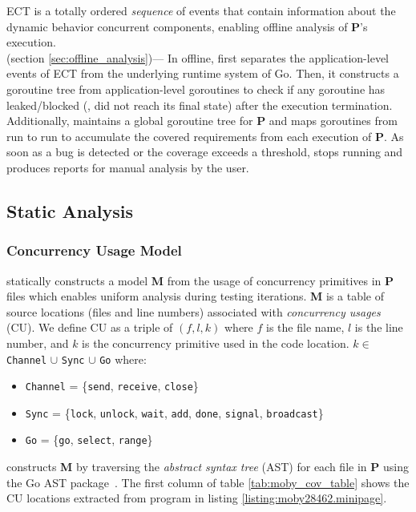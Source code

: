 %
ECT is a totally ordered \textit{sequence} of events that contain information about the dynamic behavior concurrent components, enabling offline analysis of \textbf{P}'s execution.
\\
 (section \ref{sec:offline_analysis})---
In offline, \goat first separates the application-level events of ECT from the underlying runtime system of Go.
%
Then, it constructs a goroutine tree from application-level goroutines to check if any goroutine has leaked/blocked (\ie, did not reach its final state) after the execution termination.
%
Additionally, \goat maintains a global goroutine tree for \textbf{P} and maps goroutines from run to run to accumulate the covered requirements from each execution of \textbf{P}.
%
As soon as a bug is detected or the coverage exceeds a threshold, \goat stops running and produces reports for manual analysis by the user.
%

\subsection{Static Analysis}
\label{sec:static_analysis}

\subsubsection{Concurrency Usage Model}
\goat statically constructs a model \textbf{M} from the usage of concurrency primitives in \textbf{P} files which enables uniform analysis during testing iterations.
%
\textbf{M} is a table of source locations (files and line numbers) associated with \textit{concurrency usages} (CU).
%
We define CU as a triple of $(f,l,k)$ where $f$ is the file name, $l$ is the line number, and $k$ is the concurrency primitive used in the code location.
$k\in$ \texttt{Channel} $\cup$ \texttt{Sync} $\cup$ \texttt{Go} where:
\begin{itemize}
  \item \texttt{Channel} = \{\texttt{send}, \texttt{receive}, \texttt{close}\}
  \item \texttt{Sync} = \{\texttt{lock}, \texttt{unlock}, \texttt{wait}, \texttt{add}, \texttt{done}, \texttt{signal}, \texttt{broadcast}\}
  \item \texttt{Go} = \{\texttt{go}, \texttt{select}, \texttt{range}\}
\end{itemize}

\goat constructs \textbf{M} by traversing the \textit{abstract syntax tree} (AST) for each file in \textbf{P} using the Go AST package~\cite{go-package-ast}.
%
The first column of table \ref{tab:moby_cov_table} shows the CU locations extracted from program in listing \ref{listing:moby28462.minipage}.

